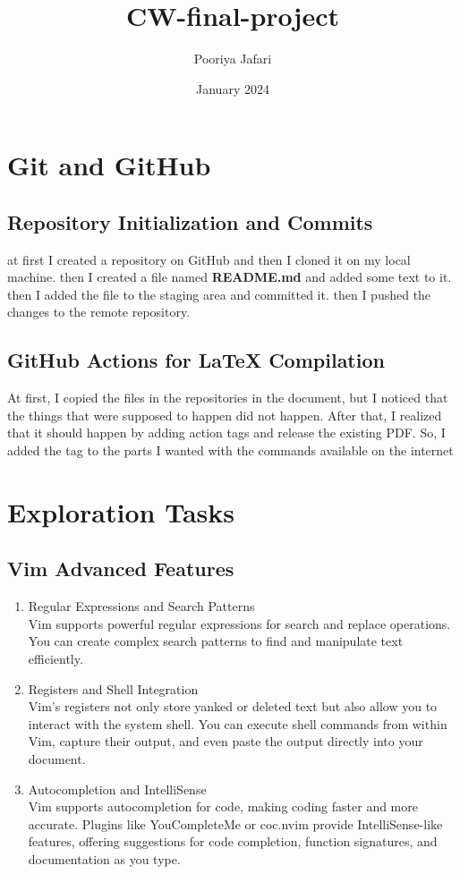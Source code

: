\documentclass[titlepage]{article}
\title{CW-final-project}
\author{Pooriya Jafari}
\date{January 2024}
\begin{document}
\maketitle
\tableofcontents

\newpage

\section{Git and GitHub}
\subsection{Repository Initialization and Commits}
at first I created a repository on GitHub and then I cloned it on my local machine. then I created a file named \textbf{README.md} and added some text to it. then I added the file to the staging area and committed it. then I pushed the changes to the remote repository.
\subsection{GitHub Actions for LaTeX Compilation}
At first, I copied the files in the repositories in the document, but I noticed that the things that were supposed to happen did not happen. After that, I realized that it should happen by adding action tags and release the existing PDF. So, I added the tag to the parts I wanted with the commands available on the internet
\newpage

\section{Exploration Tasks}
\subsection{Vim Advanced Features}
\begin{enumerate}
    \item Regular Expressions and Search Patterns\\
    Vim supports powerful regular expressions for search and replace operations. You can create complex search patterns to find and manipulate text efficiently.

    \item Registers and Shell Integration\\
    Vim's registers not only store yanked or deleted text but also allow you to interact with the system shell. You can execute shell commands from within Vim, capture their output, and even paste the output directly into your document.

    \item Autocompletion and IntelliSense\\
    Vim supports autocompletion for code, making coding faster and more accurate. Plugins like YouCompleteMe or coc.nvim provide IntelliSense-like features, offering suggestions for code completion, function signatures, and documentation as you type.
\end{enumerate}
\end{document}
